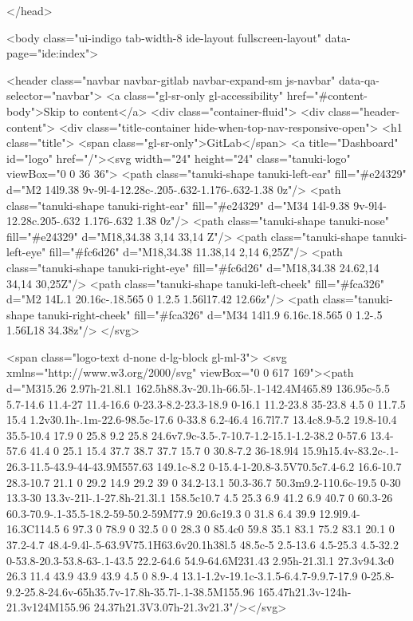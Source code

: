 {{</head>

<body class="ui-indigo tab-width-8 ide-layout fullscreen-layout" data-page="ide:index">


<header class="navbar navbar-gitlab navbar-expand-sm js-navbar" data-qa-selector="navbar">
<a class="gl-sr-only gl-accessibility" href="#content-body">Skip to content</a>
<div class="container-fluid">
<div class="header-content">
<div class="title-container hide-when-top-nav-responsive-open">
<h1 class="title">
<span class="gl-sr-only">GitLab</span>
<a title="Dashboard" id="logo" href="/"><svg width="24" height="24" class="tanuki-logo" viewBox="0 0 36 36">
  <path class="tanuki-shape tanuki-left-ear" fill="#e24329" d="M2 14l9.38 9v-9l-4-12.28c-.205-.632-1.176-.632-1.38 0z"/>
  <path class="tanuki-shape tanuki-right-ear" fill="#e24329" d="M34 14l-9.38 9v-9l4-12.28c.205-.632 1.176-.632 1.38 0z"/>
  <path class="tanuki-shape tanuki-nose" fill="#e24329" d="M18,34.38 3,14 33,14 Z"/>
  <path class="tanuki-shape tanuki-left-eye" fill="#fc6d26" d="M18,34.38 11.38,14 2,14 6,25Z"/>
  <path class="tanuki-shape tanuki-right-eye" fill="#fc6d26" d="M18,34.38 24.62,14 34,14 30,25Z"/>
  <path class="tanuki-shape tanuki-left-cheek" fill="#fca326" d="M2 14L.1 20.16c-.18.565 0 1.2.5 1.56l17.42 12.66z"/>
  <path class="tanuki-shape tanuki-right-cheek" fill="#fca326" d="M34 14l1.9 6.16c.18.565 0 1.2-.5 1.56L18 34.38z"/>
</svg>

<span class="logo-text d-none d-lg-block gl-ml-3">
<svg xmlns="http://www.w3.org/2000/svg" viewBox="0 0 617 169"><path d="M315.26 2.97h-21.8l.1 162.5h88.3v-20.1h-66.5l-.1-142.4M465.89 136.95c-5.5 5.7-14.6 11.4-27 11.4-16.6 0-23.3-8.2-23.3-18.9 0-16.1 11.2-23.8 35-23.8 4.5 0 11.7.5 15.4 1.2v30.1h-.1m-22.6-98.5c-17.6 0-33.8 6.2-46.4 16.7l7.7 13.4c8.9-5.2 19.8-10.4 35.5-10.4 17.9 0 25.8 9.2 25.8 24.6v7.9c-3.5-.7-10.7-1.2-15.1-1.2-38.2 0-57.6 13.4-57.6 41.4 0 25.1 15.4 37.7 38.7 37.7 15.7 0 30.8-7.2 36-18.9l4 15.9h15.4v-83.2c-.1-26.3-11.5-43.9-44-43.9M557.63 149.1c-8.2 0-15.4-1-20.8-3.5V70.5c7.4-6.2 16.6-10.7 28.3-10.7 21.1 0 29.2 14.9 29.2 39 0 34.2-13.1 50.3-36.7 50.3m9.2-110.6c-19.5 0-30 13.3-30 13.3v-21l-.1-27.8h-21.3l.1 158.5c10.7 4.5 25.3 6.9 41.2 6.9 40.7 0 60.3-26 60.3-70.9-.1-35.5-18.2-59-50.2-59M77.9 20.6c19.3 0 31.8 6.4 39.9 12.9l9.4-16.3C114.5 6 97.3 0 78.9 0 32.5 0 0 28.3 0 85.4c0 59.8 35.1 83.1 75.2 83.1 20.1 0 37.2-4.7 48.4-9.4l-.5-63.9V75.1H63.6v20.1h38l.5 48.5c-5 2.5-13.6 4.5-25.3 4.5-32.2 0-53.8-20.3-53.8-63-.1-43.5 22.2-64.6 54.9-64.6M231.43 2.95h-21.3l.1 27.3v94.3c0 26.3 11.4 43.9 43.9 43.9 4.5 0 8.9-.4 13.1-1.2v-19.1c-3.1.5-6.4.7-9.9.7-17.9 0-25.8-9.2-25.8-24.6v-65h35.7v-17.8h-35.7l-.1-38.5M155.96 165.47h21.3v-124h-21.3v124M155.96 24.37h21.3V3.07h-21.3v21.3"/></svg>

}}
